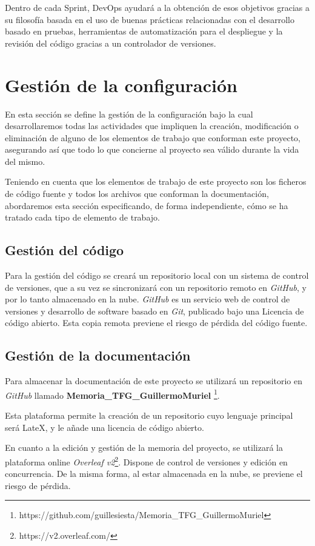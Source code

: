 Dentro de cada Sprint, DevOps ayudará a la obtención de esos objetivos gracias a su filosofía basada en el uso de buenas prácticas relacionadas con el desarrollo basado en pruebas, herramientas de automatización para el despliegue y la revisión del código gracias a un controlador de versiones.

\section{Gestión de la configuración}
En esta sección se define la gestión de la configuración bajo la cual desarrollaremos todas las actividades que impliquen la creación, modificación o eliminación de alguno de los elementos de trabajo que conforman este proyecto, asegurando así que todo lo que concierne al proyecto sea válido durante la vida del mismo.

 Teniendo en cuenta que los elementos de trabajo de este proyecto son los ficheros de código fuente y todos los archivos que conforman la documentación, abordaremos esta sección especificando, de forma independiente, cómo se ha tratado cada tipo de elemento de trabajo.
 
\subsection{Gestión del código}

Para la gestión del código se creará un repositorio local con un  sistema de control de versiones, que a su vez se sincronizará con un repositorio remoto en \textit{GitHub}, y por lo tanto almacenado en la nube. \textit{GitHub} es un servicio web de control de versiones y desarrollo de software basado en \textit{Git}, publicado bajo una Licencia de código abierto. Esta copia remota previene el riesgo de pérdida del código fuente.

\subsection{Gestión de la documentación}
Para almacenar la documentación de este proyecto se utilizará un repositorio en \textit{GitHub} llamado \textbf{Memoria\_TFG\_GuillermoMuriel} \footnote{https://github.com/guillesiesta/Memoria\_TFG\_GuillermoMuriel}.

Esta plataforma permite la creación de un repositorio cuyo lenguaje principal será LateX, y le añade una licencia de código abierto.

En cuanto a la edición y gestión de la memoria del proyecto, se utilizará la plataforma online \textit{Overleaf v2}\footnote{https://v2.overleaf.com/}. Dispone de control de versiones y edición en concurrencia. De la misma forma, al estar almacenada en la nube, se previene el riesgo de pérdida.


